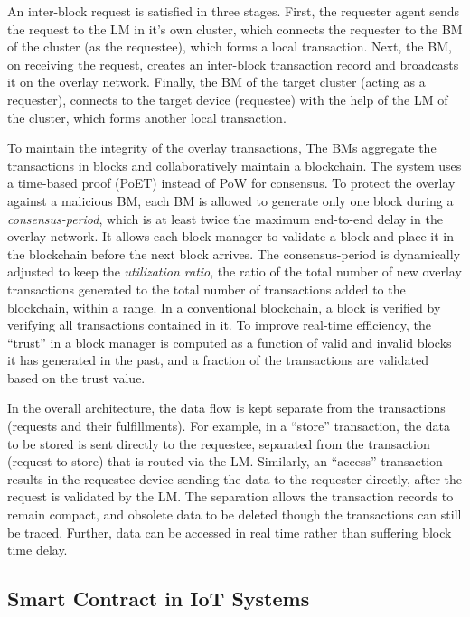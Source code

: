 An inter-block request is satisfied in three stages. First, the requester agent sends the request to the LM in it's own cluster, 
which connects the requester to the BM of the cluster (as the requestee), which forms a local transaction. Next, the BM, on 
receiving the request, creates an inter-block transaction record and broadcasts it on the overlay network. Finally, the BM of the 
target cluster (acting as a requester), connects to the target device (requestee) with the help of the LM of the cluster, which 
forms another local transaction. 

 
To maintain the integrity of the overlay transactions, The BMs aggregate the transactions in blocks and collaboratively maintain a 
blockchain. The system uses a time-based proof (PoET) instead of PoW for consensus. To protect the overlay against a malicious BM, 
each BM is allowed to generate only one block during a {\em consensus-period}, which is at least twice the maximum end-to-end delay 
in the overlay network. It allows each block manager to validate a block and place it in the blockchain before the next block arrives. 
The consensus-period is dynamically adjusted to keep the {\em utilization ratio}, the ratio of the total number of new overlay 
transactions generated to the total number of transactions added to the blockchain, within a range. In a conventional blockchain, 
a block is verified by verifying all transactions contained in it. To improve real-time efficiency, the ``trust'' in a block manager 
is computed as a function of valid and invalid blocks it has generated in the past, and a fraction of the transactions are validated 
based on the trust value. 

In the overall architecture, the data flow is kept separate from the transactions (requests and their fulfillments). For example,
in a ``store'' transaction, the data to be stored is sent directly to the requestee, separated from the transaction (request to store)
that is routed via the LM. Similarly, an ``access'' transaction results in the requestee device sending the data to the requester 
directly, after the request is validated by the LM.
The separation allows the transaction records to remain compact, and obsolete data to be deleted though the transactions can still
be traced. Further, data can be accessed in real time rather than suffering block time delay. 

\subsection{Smart Contract in IoT Systems}

